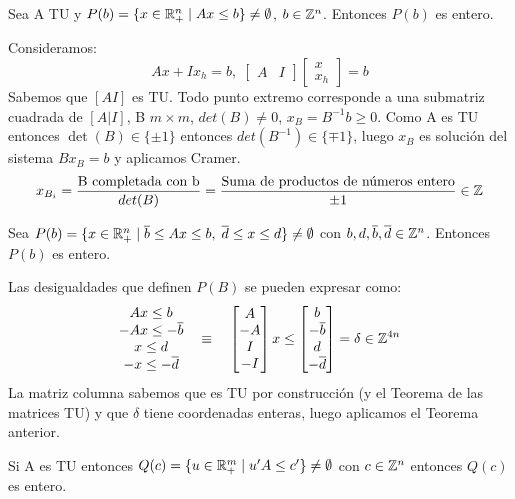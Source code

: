 \documentclass[PM.tex]{subfiles}
\begin{document}
\newpage
\begin{theorem}
Sea A TU y $P(b)=\{x \in \mathbb{R}^n_+ \mid Ax\leq b\} \neq \emptyset$, $b\in \mathbb{Z}^n$. Entonces $P(b)$ es entero.
\end{theorem}
\begin{dem}Consideramos:
\[
Ax +Ix_h = b, \; \begin{bmatrix} A & I \end{bmatrix} \begin{bmatrix}
x\\
x_h
\end{bmatrix} = b
\]
Sabemos que $[A I]$ es TU. Todo punto extremo corresponde a una submatriz cuadrada de $[A | I]$, B $m\times m$, $det(B)\neq 0$, $x_B=B^{-1}b\geq 0$. Como A es TU entonces $\det(B)\in\{\pm1\}$ entonces $det(B^{-1})\in\{\mp1\}$, luego $x_B$ es solución del sistema $Bx_B=b$ y aplicamos Cramer.
\[
x_{B_i}=\frac{\text{B completada con b}}{det(B)}=\frac{\text{Suma de productos de números entero}}{\pm1} \in \mathbb{Z}
\]\QED
\end{dem}
\begin{coro} Sea $P(b)=\{x \in \mathbb{R}^n_+ \mid \overline{b}\leq Ax\leq b,\; \overline{d}\leq x \leq d\} \neq \emptyset$ con $b,d,\overline{b},\overline{d}\in\mathbb{Z}^n$. Entonces $P(b)$ es entero.
\end{coro}
\begin{dem}
Las desigualdades que definen $P(B)$ se pueden expresar como:
\[
\begin{matrix}
Ax \leq b\\
-Ax\leq -\overline{b}\\
x\leq d\\
-x\leq -\overline{d}
\end{matrix}\quad
\equiv\quad
\begin{bmatrix}
A\\
-A\\
I\\
-I
\end{bmatrix}
x\leq
\begin{bmatrix}
b\\
-\overline{b}\\
d\\
-\overline{d}
\end{bmatrix} = \delta \in \mathbb{Z}^{4n}
\]
La matriz columna sabemos que es TU por construcción (y el Teorema de las matrices TU) y que $\delta$ tiene coordenadas enteras, luego aplicamos el Teorema anterior.\QED
\end{dem}
\begin{coro}
Si A es TU entonces $Q(c) = \{u\in\mathbb{R}^m_+ \mid u'A\leq c'\}\neq\emptyset$ con $c\in\mathbb{Z}^n$ entonces $Q(c)$ es entero.
\end{coro}
\end{document}
